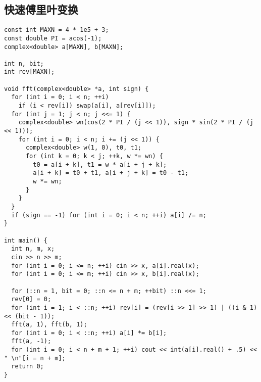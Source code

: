 \subsection{快速傅里叶变换}
\begin{lstlisting}
const int MAXN = 4 * 1e5 + 3;
const double PI = acos(-1);
complex<double> a[MAXN], b[MAXN];

int n, bit;
int rev[MAXN];

void fft(complex<double> *a, int sign) {
  for (int i = 0; i < n; ++i)
    if (i < rev[i]) swap(a[i], a[rev[i]]);
  for (int j = 1; j < n; j <<= 1) {
    complex<double> wn(cos(2 * PI / (j << 1)), sign * sin(2 * PI / (j << 1)));
    for (int i = 0; i < n; i += (j << 1)) {
      complex<double> w(1, 0), t0, t1;
      for (int k = 0; k < j; ++k, w *= wn) {
        t0 = a[i + k], t1 = w * a[i + j + k];
        a[i + k] = t0 + t1, a[i + j + k] = t0 - t1;
        w *= wn;
      }
    }
  }
  if (sign == -1) for (int i = 0; i < n; ++i) a[i] /= n;
}

int main() {
  int n, m, x;
  cin >> n >> m;
  for (int i = 0; i <= n; ++i) cin >> x, a[i].real(x);
  for (int i = 0; i <= m; ++i) cin >> x, b[i].real(x);

  for (::n = 1, bit = 0; ::n <= n + m; ++bit) ::n <<= 1;
  rev[0] = 0;
  for (int i = 1; i < ::n; ++i) rev[i] = (rev[i >> 1] >> 1) | ((i & 1) << (bit - 1));
  fft(a, 1), fft(b, 1);
  for (int i = 0; i < ::n; ++i) a[i] *= b[i];
  fft(a, -1);
  for (int i = 0; i < n + m + 1; ++i) cout << int(a[i].real() + .5) << " \n"[i = n + m];
  return 0;
}
\end{lstlisting}
